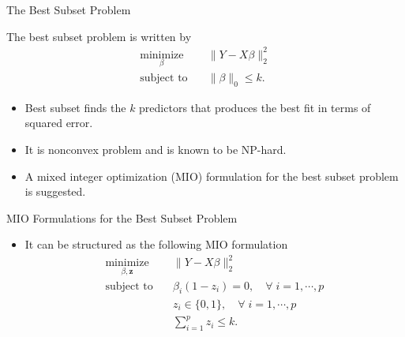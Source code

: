 \documentclass[blue, 10pt]{beamer}
\begin{document}
\begin{frame}{The Best Subset Problem}

  The best subset problem is written by
  \begin{equation*}
    \begin{split}
      \underset{\beta}{\text{minimize}} &\quad \|Y-X\beta\|_2^2 \\
      \text{subject to} &\quad \|\beta\|_0\leq k.
    \end{split}
  \end{equation*}
  
  \begin{itemize}
    \item Best subset finds the $k$ predictors that produces the best fit in terms of squared error.
    \item It is nonconvex problem and is known to be NP-hard.
    \item A mixed integer optimization (MIO) formulation for the best subset problem is suggested.
  \end{itemize}
  
\end{frame}
  

\begin{frame}{MIO Formulations for the Best Subset Problem}
  
  \begin{itemize}
    \item It can be structured as the following MIO formulation
    \begin{align*}
      \underset{\beta, \mathbf{z}}{\text{minimize}} \quad& \|Y-X\beta\|_2^2 \\
      \text{subject to} \quad& \beta_i(1-z_i)=0, \quad \forall \; i=1, \cdots, p \\
        &z_i\in \{0,1\}, \quad \forall \; i=1, \cdots, p\\
        &\sum_{i=1}^p z_i\leq k.
    \end{align*}
  \end{itemize}
  
\end{frame}
  
\end{document}
